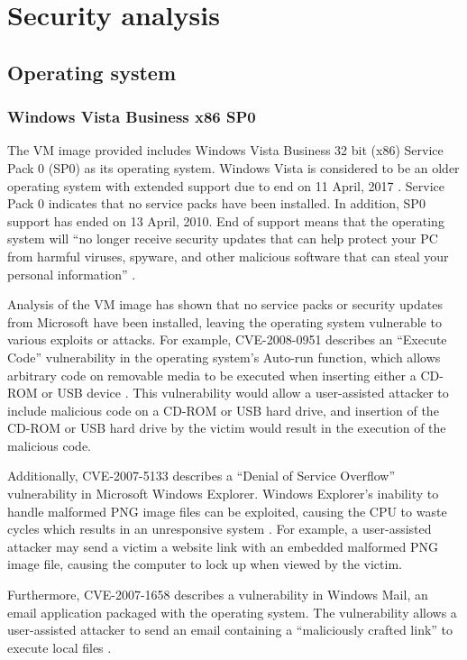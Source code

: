 \section{Security analysis}

\subsection{Operating system}

\subsubsection{Windows Vista Business x86 SP0}

The VM image provided includes Windows Vista Business 32 bit (x86) Service Pack 0 (SP0) as its operating system. Windows Vista is considered to be an older operating system with extended support due to end on 11 April, 2017 \citep{Microsoft2014}. Service Pack 0 indicates that no service packs have been installed. In addition, SP0 support has ended on 13 April, 2010. End of support means that the operating system will ``no longer receive security updates that can help protect your PC from harmful viruses, spyware, and other malicious software that can steal your personal information'' \citep{Microsoft2015}.

Analysis of the VM image has shown that no service packs or security updates from Microsoft have been installed, leaving the operating system vulnerable to various exploits or attacks. For example, CVE-2008-0951 describes an ``Execute Code'' vulnerability in the operating system's Auto-run function, which allows arbitrary code on removable media to be executed when inserting either a CD-ROM or USB device \citep{SecurityFocus2008}. This vulnerability would allow a user-assisted attacker to include malicious code on a CD-ROM or USB hard drive, and insertion of the CD-ROM or USB hard drive by the victim would result in the execution of the malicious code.

Additionally, CVE-2007-5133 describes a ``Denial of Service Overflow'' vulnerability in Microsoft Windows Explorer. Windows Explorer's inability to handle malformed PNG image files can be exploited, causing the CPU to waste cycles which results in an unresponsive system \citep{SecurityFocus2007a}. For example, a user-assisted attacker may send a victim a website link with an embedded malformed PNG image file, causing the computer to lock up when viewed by the victim.

Furthermore, CVE-2007-1658 describes a vulnerability in Windows Mail, an email application packaged with the operating system. The vulnerability allows a user-assisted attacker to send an email containing a ``maliciously crafted link'' to execute local files \citep{SecurityFocus2007b}.

